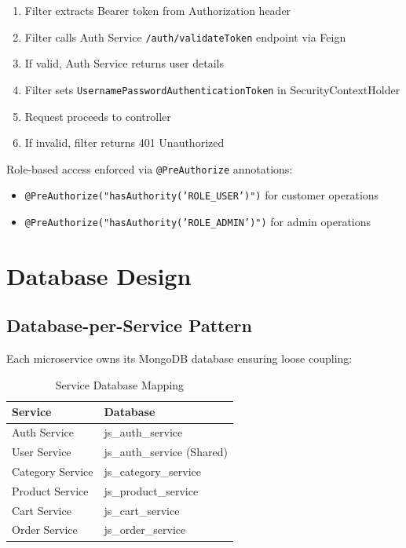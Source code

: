 \begin{enumerate}
    \item Filter extracts Bearer token from Authorization header
    \item Filter calls Auth Service \texttt{/auth/validateToken} endpoint via Feign
    \item If valid, Auth Service returns user details
    \item Filter sets \texttt{UsernamePasswordAuthenticationToken} in SecurityContextHolder
    \item Request proceeds to controller
    \item If invalid, filter returns 401 Unauthorized
\end{enumerate}

Role-based access enforced via \texttt{@PreAuthorize} annotations:
\begin{itemize}
    \item \texttt{@PreAuthorize("hasAuthority('ROLE\_USER')")} for customer operations
    \item \texttt{@PreAuthorize("hasAuthority('ROLE\_ADMIN')")} for admin operations
\end{itemize}

\section{Database Design}

\subsection{Database-per-Service Pattern}

Each microservice owns its MongoDB database ensuring loose coupling:

\begin{table}[h!]
\centering
\caption{Service Database Mapping}
\begin{tabular}{|l|l|}
\hline
\textbf{Service} & \textbf{Database} \\
\hline
Auth Service & js\_auth\_service \\
User Service & js\_auth\_service (Shared) \\
Category Service & js\_category\_service \\
Product Service & js\_product\_service \\
Cart Service & js\_cart\_service \\
Order Service & js\_order\_service \\
\hline
\end{tabular}
\end{table}

